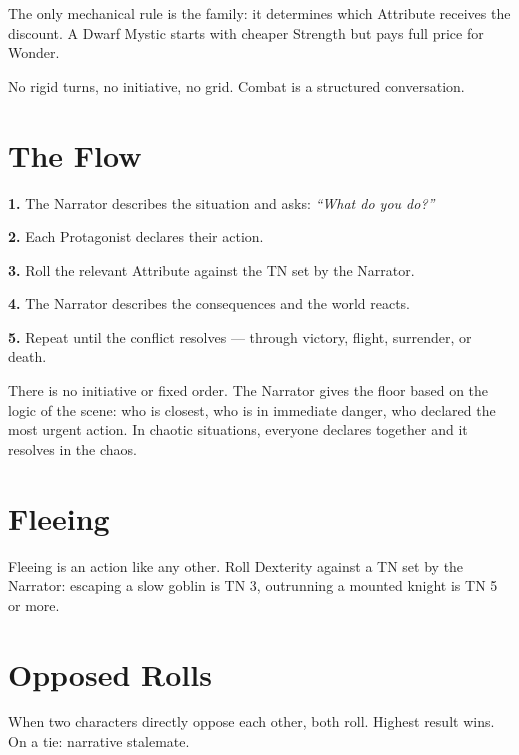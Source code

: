 \documentclass[10pt,a4paper]{article}
\begin{document}
The only mechanical rule is the family: it determines which Attribute receives the discount. A Dwarf Mystic starts with cheaper Strength but pays full price for Wonder.




No rigid turns, no initiative, no grid. Combat is a structured conversation.


\section*{The Flow}

\textbf{1.} The Narrator describes the situation and asks: \textit{“What do you do?”}


\textbf{2.} Each Protagonist declares their action.


\textbf{3.} Roll the relevant Attribute against the TN set by the Narrator.


\textbf{4.} The Narrator describes the consequences and the world reacts.


\textbf{5.} Repeat until the conflict resolves — through victory, flight, surrender, or death.


There is no initiative or fixed order. The Narrator gives the floor based on the logic of the scene: who is closest, who is in immediate danger, who declared the most urgent action. In chaotic situations, everyone declares together and it resolves in the chaos.


\section*{Fleeing}

Fleeing is an action like any other. Roll Dexterity against a TN set by the Narrator: escaping a slow goblin is TN 3, outrunning a mounted knight is TN 5 or more.


\section*{Opposed Rolls}

When two characters directly oppose each other, both roll. Highest result wins. On a tie: narrative stalemate.
\end{document}
